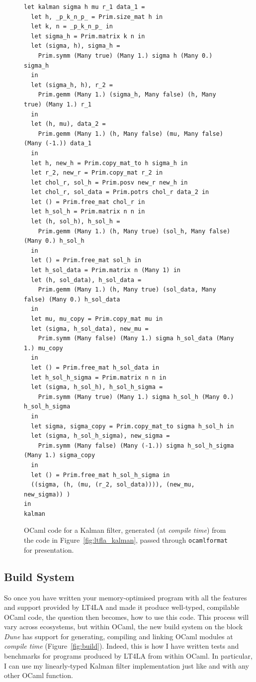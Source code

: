 \begin{figure}[p]
    \centering
    \begin{verbatim}
let kalman sigma h mu r_1 data_1 =
  let h, _p_k_n_p_ = Prim.size_mat h in
  let k, n = _p_k_n_p_ in
  let sigma_h = Prim.matrix k n in
  let (sigma, h), sigma_h =
    Prim.symm (Many true) (Many 1.) sigma h (Many 0.) sigma_h
  in
  let (sigma_h, h), r_2 =
    Prim.gemm (Many 1.) (sigma_h, Many false) (h, Many true) (Many 1.) r_1
  in
  let (h, mu), data_2 =
    Prim.gemm (Many 1.) (h, Many false) (mu, Many false) (Many (-1.)) data_1
  in
  let h, new_h = Prim.copy_mat_to h sigma_h in
  let r_2, new_r = Prim.copy_mat r_2 in
  let chol_r, sol_h = Prim.posv new_r new_h in
  let chol_r, sol_data = Prim.potrs chol_r data_2 in
  let () = Prim.free_mat chol_r in
  let h_sol_h = Prim.matrix n n in
  let (h, sol_h), h_sol_h =
    Prim.gemm (Many 1.) (h, Many true) (sol_h, Many false) (Many 0.) h_sol_h
  in
  let () = Prim.free_mat sol_h in
  let h_sol_data = Prim.matrix n (Many 1) in
  let (h, sol_data), h_sol_data =
    Prim.gemm (Many 1.) (h, Many true) (sol_data, Many false) (Many 0.) h_sol_data
  in
  let mu, mu_copy = Prim.copy_mat mu in
  let (sigma, h_sol_data), new_mu =
    Prim.symm (Many false) (Many 1.) sigma h_sol_data (Many 1.) mu_copy
  in
  let () = Prim.free_mat h_sol_data in
  let h_sol_h_sigma = Prim.matrix n n in
  let (sigma, h_sol_h), h_sol_h_sigma =
    Prim.symm (Many true) (Many 1.) sigma h_sol_h (Many 0.) h_sol_h_sigma
  in
  let sigma, sigma_copy = Prim.copy_mat_to sigma h_sol_h in
  let (sigma, h_sol_h_sigma), new_sigma =
    Prim.symm (Many false) (Many (-1.)) sigma h_sol_h_sigma (Many 1.) sigma_copy
  in
  let () = Prim.free_mat h_sol_h_sigma in
  ((sigma, (h, (mu, (r_2, sol_data)))), (new_mu, new_sigma)) )
in
kalman
    \end{verbatim}
    \caption{OCaml code for a Kalman filter, generated (at \emph{compile time})
        from the code in Figure~\ref{fig:ltfla_kalman}, passed through
        \texttt{ocamlformat} for presentation.}\label{fig:ocaml_kalman}

\end{figure}

\subsection{Build System}

So once you have written your memory-optimised program with all the features
and support provided by LT4LA and made it produce well-typed, compilable OCaml
code, the question then becomes, how to use this code. This process will vary
across ecosystems, but within OCaml, the new build system on the block
\emph{Dune} has support for generating, compiling and linking OCaml modules at
\emph{compile time} (Figure~\ref{fig:build}). Indeed, this is how I have written
tests and benchmarks for programs produced by LT4LA from within OCaml. In
particular, I can use my linearly-typed Kalman filter implementation just like
and with any other OCaml function.

